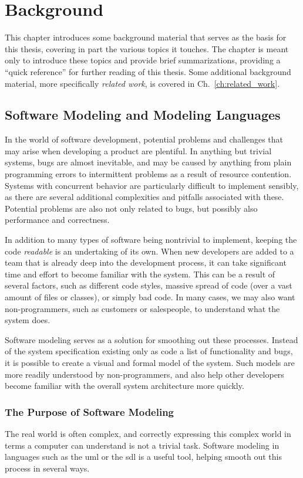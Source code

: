 \chapter{Background}
\label{ch:background}
This chapter introduces some background material that serves as the basis for this thesis, covering in part the various topics it touches. The chapter is meant only to introduce these topics and provide brief summarizations, providing a ``quick reference'' for further reading of this thesis. Some additional background material, more specifically \emph{related work}, is covered in Ch.~\ref{ch:related_work}. 

\section{Software Modeling and Modeling Languages}
\label{sec:software_modeling}
In the world of software development, potential problems and challenges that may arise when developing a product are plentiful. In anything but trivial systems, bugs are almost inevitable, and may be caused by anything from plain programming errors to intermittent problems as a result of resource contention. Systems with concurrent behavior are particularly difficult to implement sensibly, as there are several additional complexities and pitfalls associated with these. Potential problems are also not only related to bugs, but possibly also performance and correctness.

\noindent
In addition to many types of software being nontrivial to implement, keeping the code \emph{readable} is an undertaking of its own. When new developers are added to a team that is already deep into the development process, it can take significant time and effort to become familiar with the system. This can be a result of several factors, such as different code styles, massive spread of code (over a vast amount of files or classes), or simply bad code. In many cases, we may also want non-programmers, such as customers or salespeople, to understand what the system does.

\noindent
Software modeling serves as a solution for smoothing out these processes. Instead of the system specification existing only as code a list of functionality and bugs, it is possible to create a visual and formal model of the system. Such models are more readily understood by non-programmers, and also help other developers become familiar with the overall system architecture more quickly.

\subsection{The Purpose of Software Modeling}
\label{sec:software_modeling_purpose}
The real world is often complex, and correctly expressing this complex world in terms a computer can understand is not a trivial task. Software modeling in languages such as the \gls{uml} or the \gls{sdl} is a useful tool, helping smooth out this process in several ways.

